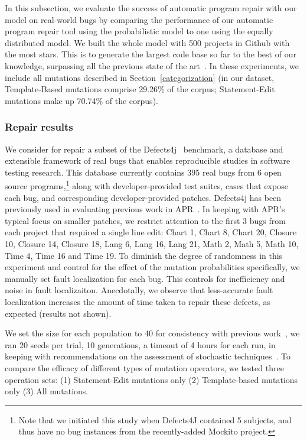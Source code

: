 \documentclass[conference]{IEEEtran}
\begin{document}
In this subsection, we evaluate the success of automatic program repair with our
model on real-world bugs  by comparing the performance of our 
automatic program repair tool using the probabilistic model to one using the
equally distributed model.  
We built the whole model with 500
projects in Github with the most stars.
 This is to generate the largest code base so far to the best 
of our knowledge, surpassing all the previous state of the 
art~\cite{long16proph,Soto15,zhong15,martinez15,xuan16}. 
In these experiments, we include all mutations described in
Section~\ref{categorization} (in our dataset, Template-Based mutations comprise 29.26\% of the corpus; Statement-Edit mutations make up 70.74\% of the 
corpus).

\subsubsection{Repair results}

We consider for repair a subset of the Defects4j~\cite{just14}
benchmark, a database and extensible 
framework of real bugs that enables reproducible studies in software testing 
research. This database currently contains 395 real bugs from 6
open source programs,\footnote{Note that we initiated this study when Defects4J
  contained 5 subjects, and thus have no bug instances from the recently-added
  Mockito project.} along with developer-provided test suites, cases that
expose each bug,  and
corresponding developer-provided patches. Defects4j has been previously used
in evaluating previous work in APR~\cite{Durieux15}.
In keeping with APR's typical focus on smaller patches, we
restrict attention to the first 3 bugs from each project that required a 
single line edit: Chart 1, 
Chart 8, Chart 20, Closure 10, Closure 14, Closure 18, Lang 6, Lang 16, Lang 21, 
Math 2, Math 5, Math 10, Time 4, Time 16 and Time 19.
To diminish the degree of randomness in this experiment and control for the
effect of the mutation probabilities specifically,  we manually
set fault localization for each bug.  This controls for inefficiency and noise
in fault localizaiton. Anecdotally, we observe that less-accurate fault localization increases the amount of
time taken to repair these defects, as expected (results not shown). 

We set the size for each population to 40 for consistency with 
previous work~\cite{legoues12,kim2013}, we ran 20
seeds per trial, 10 generations, a timeout of 4 hours for each run, in keeping with 
recommendations on the assessment of stochastic techniques~\cite{arcuri11}.
To compare the efficacy of different types of mutation operators,
we tested three operation sets: (1) Statement-Edit mutations only (2) Template-based mutations 
only (3) All mutations.  
\end{document}
